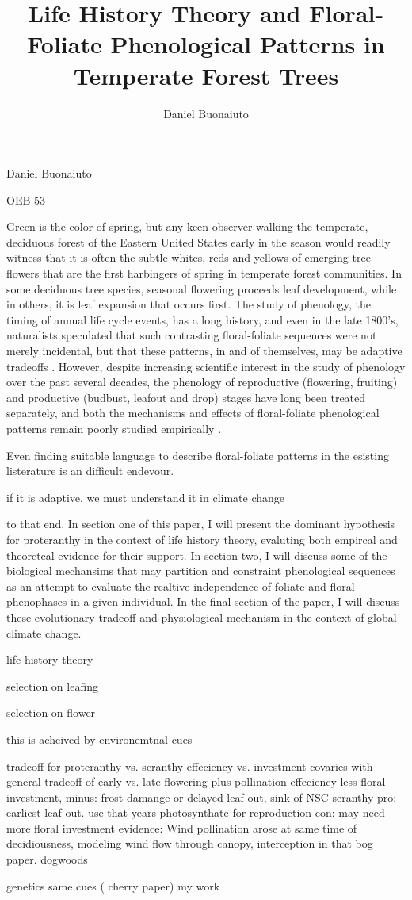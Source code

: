 \documentclass{article}\usepackage[]{graphicx}\usepackage[]{color}
\begin{document}
\title{Life History Theory and Floral-Foliate Phenological Patterns in Temperate Forest Trees}
\author{Daniel Buonaiuto}
Daniel Buonaiuto
\par OEB 53
\par\data{\today}

Green is the color of spring, but any keen observer walking the temperate, deciduous forest of the Eastern United States early in the season would readily witness that it is often the subtle whites, reds and yellows of emerging tree flowers that are the first harbingers of spring in temperate forest communities. In some deciduous tree species, seasonal flowering proceeds leaf development, while in others, it is leaf expansion that occurs first. The study of phenology, the timing of annual life cycle events, has a long history, and even in the late 1800's, naturalists speculated that such contrasting floral-foliate sequences were not merely incidental, but that these patterns, in and of themselves, may be adaptive tradeoffs \citep{}. However, despite increasing scientific interest in the study of phenology over the past several decades, the phenology of reproductive (flowering, fruiting) and productive (budbust, leafout and drop) stages have long been treated separately, and both the mechanisms and effects of floral-foliate phenological patterns remain poorly studied empirically \citep{Wolkovich2014}. 
\par Even finding suitable language to describe floral-foliate patterns in the esisting listerature is an difficult endevour. 
\par if it is adaptive, we must understand it in climate change
\par to that end, In section one of this paper, I will present the dominant hypothesis for proteranthy in the context of life history theory, evaluting both empircal and theoretcal evidence for their support. In section two, I will discuss some of the biological mechansims that may partition and constraint phenological sequences as an attempt to evaluate the realtive independence of foliate and floral phenophases in a given individual. In the final section of the paper, I will discuss these evolutionary tradeoff and physiological mechanism in the context of global climate change.
\par life history theory
\par selection on leafing
\par selection on flower
\par this is acheived by environemtnal cues
\par tradeoff for proteranthy vs. seranthy effeciency vs. investment
covaries with general tradeoff of early vs. late flowering
plus pollination effeciency-less floral investment, 
minus: frost damange or delayed leaf out, sink of NSC
seranthy
pro: earliest leaf out. use that years photosynthate for reproduction
con: may need more floral investment
evidence: Wind pollination arose at same time of decidiousness, modeling wind flow through canopy, interception in that bog paper. dogwoods

\par
genetics
same cues ( cherry paper)
my work
\end{document}
